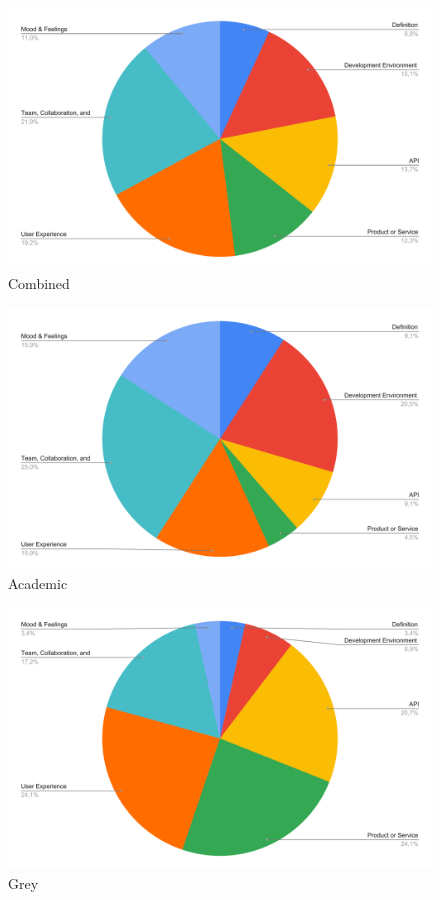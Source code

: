 \documentclass[english, 12pt, a4paper, sci, utf8, a-1b, online]{aaltothesis}
\begin{document}
\begin{figure}[H]
  \caption{Combined}
  \begin{center}
    \includegraphics[width=\textwidth]{context-combined.pdf}
  \end{center}
\end{figure}

\begin{figure}[H]
  \caption{Academic}
  \begin{center}
    \includegraphics[width=\textwidth]{context-academic.pdf}
  \end{center}
\end{figure}

\begin{figure}[H]
  \caption{Grey}
  \begin{center}
    \includegraphics[width=\textwidth]{context-grey.pdf}
  \end{center}
\end{figure}
\end{document}
